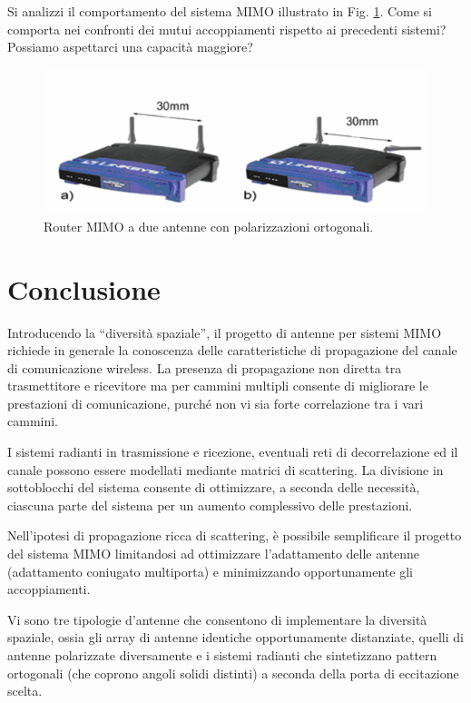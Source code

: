 \documentclass[technote]{IEEEtran}
\begin{document}
\par Si analizzi il comportamento del sistema MIMO illustrato in Fig. \ref{fig:39}. Come si comporta nei confronti dei mutui accoppiamenti rispetto ai precedenti sistemi? Possiamo aspettarci una capacità maggiore?
\begin{figure}[!ht]
\centering
\includegraphics[width=.8\columnwidth]{figure39}
\caption{Router MIMO a due antenne con polarizzazioni ortogonali.}
\label{fig:39}
\end{figure}

\section{Conclusione}

\par Introducendo la ``diversità spaziale'', il progetto di antenne per sistemi MIMO richiede in generale la conoscenza delle caratteristiche di propagazione del canale di comunicazione wireless. La presenza di propagazione non diretta tra trasmettitore e ricevitore ma per cammini multipli consente di migliorare le prestazioni di comunicazione, purché non vi sia forte correlazione tra i vari cammini.

 I sistemi radianti in trasmissione e ricezione, eventuali reti di decorrelazione ed il canale possono essere modellati mediante matrici di scattering. La divisione in sottoblocchi del sistema consente di ottimizzare, a seconda delle necessità, ciascuna parte del sistema per un aumento complessivo delle prestazioni. 
 
Nell'ipotesi di propagazione ricca di scattering, è possibile semplificare il progetto del sistema MIMO limitandosi ad ottimizzare l'adattamento delle antenne (adattamento coniugato multiporta) e minimizzando opportunamente gli accoppiamenti. 

Vi sono tre tipologie d'antenne che consentono di implementare la diversità spaziale, ossia gli array di antenne identiche opportunamente distanziate, quelli di antenne polarizzate diversamente e i sistemi radianti che sintetizzano pattern ortogonali (che coprono angoli solidi distinti) a seconda della porta di eccitazione scelta.
\end{document}

